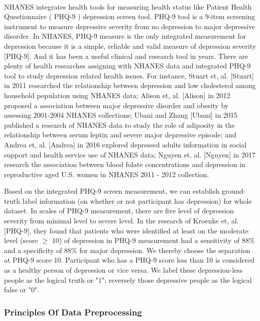 \documentclass[runningheads]{llncs}
\begin{document}
\paragraph{}
NHANES integrates health tools for measuring health status like Patient Health Questionnaire ( PHQ-9 ) depression screen tool. PHQ-9 tool is a 9-item screening instrument to measure depressive severity from no depression to major depressive disorder. In NHANES, PHQ-9 measure is the only integrated measurement for depression because it is a simple, reliable and valid measure of depression severity [PHQ-9]. And it has been a useful clinical and research tool in years. There are plenty of health researches assigning with NHANES data and integrated PHQ-9 tool to study depression related health issues. For instance, Stuart et, al. [Stuart] in 2011 researched the relationship between depression and low cholesterol among household population using NHANES data; Alison et, al. [Alison] in 2012 proposed a association between major depressive disorder and obesity by assessing 2001-2004 NHANES collections; Ubani and Zhang [Ubani] in 2015 published a research of NHANES data to study the role of adiposity in the relationship between serum leptin and severe major depressive episode; and Andrea et, al. [Andrea] in 2016 explored depressed adults information in social support and health service use of NHANES data; Nguyen et, al. [Nguyen] in 2017 research the association between blood folate concentrations and depression in reproductive aged U.S. women in NHANES 2011 - 2012 collection.

Based on the integrated PHQ-9 screen measurement, we can establish ground-truth label information (on whether or not participant has depression) for whole dataset. In scales of PHQ-9 measurement, there are five level of depression severity from minimal level to severe level. In the research of Kroenke et, al. [PHQ-9], they found that patients who were identified at least on the moderate level (score $\geq$ 10) of depression in PHQ-9 measurement had a sensitivity of 88\% and a specificity of 88\% for major depression. We thereby choose the separation at PHQ-9 score 10. Participant who has a PHQ-9 score less than 10 is considered as a healthy person of depression or vice versa. We label these depression-less people as the logical truth or "1"; reversely those depressive people as the logical false or  "0".
%
%
%
\subsubsection{Principles Of Data Preprocessing}
\end{document}
